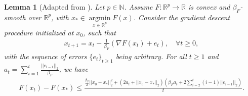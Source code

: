 \documentclass{article}
\newtheorem{lemma}{Lemma}
\begin{document}
\begin{lemma}[Adapted from \cite{Schmidt_2011_Conv}]
\label{lemma:Inexact_GD_lemma}
Let $p \in \mathbb{N}$. Assume $F : \mathbb{R}^p \rightarrow \mathbb{R}$ is convex and $\beta_F$-smooth over $\mathbb{R}^p$, with $x_* \in \mathop{\arg\min}\limits_{x \in \mathbb{R}^p}F(x)$. Consider the gradient descent procedure initialized at $x_0$, such that
\begin{align*}
x_{t + 1} = x_t - \frac{1}{\beta_F}(\nabla F(x_t) + e_t), \quad \forall t \ge 0,
\end{align*}
with the sequence of errors $\{e_{t}\}_{t \geq 1}$ being arbitrary. For all $t \geq 1$ and $a_t = \sum_{i = 1}^t\frac{||e_{i - 1}||_2}{\beta_F}$, we have 
\begin{align*}
F(x_t) - F(x_*) \leq \frac{\frac{\beta_F}{2}||x_0 - x_*||_2^2 + (2a_t + ||x_0 - x_*||_2)\left(\beta_Fa_t + 2\sum_{i = 2}^t(i - 1)||e_{i - 1}||_2\right)}{t}.
\end{align*}
\end{lemma}
\end{document}
